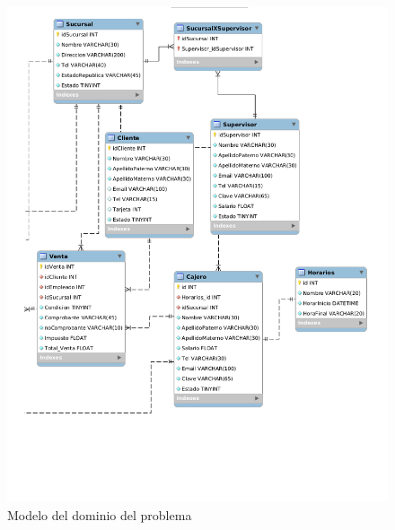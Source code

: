 \begin{figure}[htbp!]
	\begin{center}
		\includegraphics[width=.9\textwidth]{images/diagramaRelacional2}
		\caption{Modelo del dominio del problema}
		\label{fig:modeloDeDominio}
	\end{center}
\end{figure}
\newpage

\newenvironment{cdtEntidad}[2]{%
	\def \varBusinessEntityId{#2}%
	\hypertarget{#1}{\hspace{1pt}}%
	\newline%
	\noindent{\texttt{[image: images/uc/classRule]}}%
	\vspace{-25pt}%
	\subsection{Entidad: #2}%
	\noindent\begin{longtable}{|p{.2\textwidth}| p{.15\textwidth} | p{.46\textwidth} |p{.08\textwidth} |}%
	\hline%
	\multicolumn{4}{|c|}{{\cellcolor{colorSecundario}\color{white}Atributos}}\\ \hline%
	{\cellcolor{colorAgua}Nombre} &%
	{\cellcolor{colorAgua}Tipo} &%
	{\cellcolor{colorAgua}Descripción} &%
	{\cellcolor{colorAgua}Requerido}%
	\\ \hline%
	\endhead%
}{%
	\end{longtable}%
}

